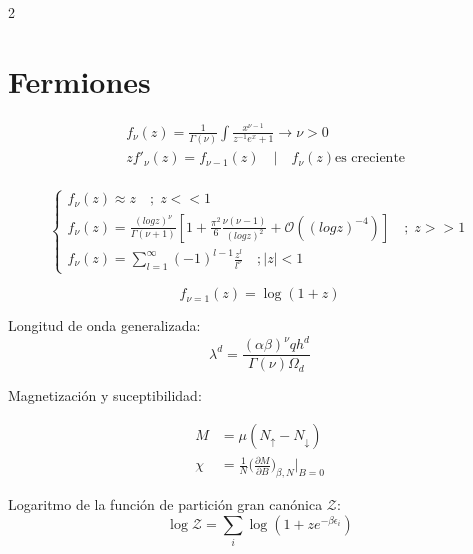 \documentclass[a4, 12pt]{article}
\begin{document}
\begin{multicols}{2}
    \section*{Fermiones}
    \begin{equation*}
      \begin{aligned}
        &f_{\nu}(z) = \frac{1}{\Gamma(\nu)} \int \frac{x^{\nu - 1}}{z^{-1}e^{x} + 1} \rightarrow \nu > 0\\
        &zf'_{\nu}(z) = f_{\nu - 1}(z) \quad | \quad f_{\nu}(z) \text{es creciente}\\
      \end{aligned}
    \end{equation*}

    \begin{equation*}
      \begin{cases}
        f_{\nu}(z) \approx z \quad;\; z<<1 \\
        f_{\nu}(z) = \frac{(logz)^{\nu}}{\Gamma(\nu + 1)}[1 + \frac{\pi^2}{6} \frac{\nu(\nu - 1)}{(logz)^2} + \mathcal{O}((logz)^{-4})] \quad;\; z>>1 \\
        f_{\nu}(z) = \sum_{l = 1}^{\infty} (-1)^{l -1} \frac{z^{l}}{l^{\nu}} \quad ; |z|<1
      \end{cases}
    \end{equation*}

    \begin{equation*}
      f_{\nu = 1}(z) = \log(1 + z)
    \end{equation*}
    
    Longitud de onda generalizada:
    \begin{equation*}
      \lambda^{d} = \frac{(\alpha \beta)^{\nu}qh^{d}}{\Gamma(\nu)\Omega_{d}}
    \end{equation*}

    Magnetización y suceptibilidad:

    \begin{equation*}
      \begin{aligned}
        M &= \mu(N_{\uparrow} - N_{\downarrow}) \\
        \chi &= \frac{1}{N} \bigg(\frac{\partial M}{\partial B}\bigg)_{\beta,N} \bigg|_{B = 0}
      \end{aligned}
    \end{equation*}

    Logaritmo de la función de partición gran canónica $\mathcal{Z}$:
    \begin{equation*}
      \log{\mathcal{Z}} = \sum_i \log(1 + z e^{-\beta \epsilon_i})
    \end{equation*}


\end{multicols}
\end{document}
